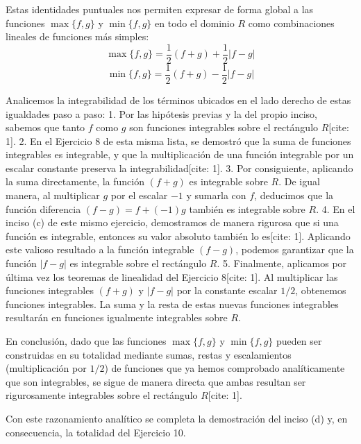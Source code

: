 \documentclass[11pt,letterpaper]{article}
\begin{document}
Estas identidades puntuales nos permiten expresar de forma global a las funciones $\max\{f,g\}$ y $\min\{f,g\}$ en todo el dominio $R$ como combinaciones lineales de funciones más simples:
\begin{equation*}
\max\{f,g\} = \frac{1}{2}(f + g) + \frac{1}{2}|f - g|
\end{equation*}
\begin{equation*}
\min\{f,g\} = \frac{1}{2}(f + g) - \frac{1}{2}|f - g|
\end{equation*}

Analicemos la integrabilidad de los términos ubicados en el lado derecho de estas igualdades paso a paso:
1. Por las hipótesis previas y la del propio inciso, sabemos que tanto $f$ como $g$ son funciones integrables sobre el rectángulo $R$[cite: 1].
2. En el Ejercicio 8 de esta misma lista, se demostró que la suma de funciones integrables es integrable, y que la multiplicación de una función integrable por un escalar constante preserva la integrabilidad[cite: 1]. 
3. Por consiguiente, aplicando la suma directamente, la función $(f+g)$ es integrable sobre $R$. De igual manera, al multiplicar $g$ por el escalar $-1$ y sumarla con $f$, deducimos que la función diferencia $(f-g) = f + (-1)g$ también es integrable sobre $R$.
4. En el inciso (c) de este mismo ejercicio, demostramos de manera rigurosa que si una función es integrable, entonces su valor absoluto también lo es[cite: 1]. Aplicando este valioso resultado a la función integrable $(f-g)$, podemos garantizar que la función $|f-g|$ es integrable sobre el rectángulo $R$.
5. Finalmente, aplicamos por última vez los teoremas de linealidad del Ejercicio 8[cite: 1]. Al multiplicar las funciones integrables $(f+g)$ y $|f-g|$ por la constante escalar $1/2$, obtenemos funciones integrables. La suma y la resta de estas nuevas funciones integrables resultarán en funciones igualmente integrables sobre $R$.

En conclusión, dado que las funciones $\max\{f,g\}$ y $\min\{f,g\}$ pueden ser construidas en su totalidad mediante sumas, restas y escalamientos (multiplicación por $1/2$) de funciones que ya hemos comprobado analíticamente que son integrables, se sigue de manera directa que ambas resultan ser rigurosamente integrables sobre el rectángulo $R$[cite: 1]. 

Con este razonamiento analítico se completa la demostración del inciso (d) y, en consecuencia, la totalidad del Ejercicio 10.
\end{document}

